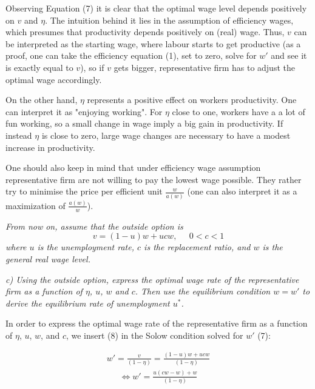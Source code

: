 \documentclass[11pt]{article} %
\begin{document}
\bigskip
Observing Equation (7) it is clear that the optimal wage level depends positively on $v$ and $\eta$. The intuition behind it lies in the assumption of efficiency wages, which presumes that productivity depends positively on (real) wage. Thus, $v$ can be interpreted as the starting wage, where labour starts to get productive (as a proof, one can take the efficiency equation (1), set to zero, solve for $w'$ and see it is exactly equal to $v$), so if $v$ gets bigger, representative firm has to adjust the optimal wage accordingly.\par

On the other hand, $\eta$ represents a positive effect on workers productivity. One can interpret it as "enjoying working". For $\eta$ close to one, workers have a a lot of fun working, so a small change in wage imply a big gain in productivity. If instead $\eta$ is close to zero, large wage changes are necessary to have a modest increase in productivity. \par

One should also keep in mind that under efficiency wage assumption representative firm are not willing to pay the lowest wage possible. They rather try to minimise the price per efficient unit $\frac{w} {a(w)}$ (one can also interpret it as a maximization of $\frac{a(w)} {w}$).




\pagebreak
\textit{From now on, assume that the outside option is}
\begin{equation}
    v = (1-u)w+ucw, \;\;\;\;\; 0<c<1
\end{equation}
\textit{where $u$ is the unemployment rate, $c$ is the replacement ratio, and $w$ is the general real wage level.}



\bigskip
\textit{c) Using the outside option, express the optimal wage rate of the representative firm as a function of $\eta$, $u$, $w$ and $c$. Then use the equilibrium
condition $w=w'$ to derive the equilibrium rate of unemployment $u^*$.} \par

\bigskip
In order to express  the  optimal  wage  rate  of  the  representative  firm  as
a  function  of $\eta$, $u$, $w$, and $c$, we insert (8) in the Solow condition solved for $w'$ (7):

\begin{align*}
    w' = \frac{v} {(1 - \eta)} = \frac{(1-u)w+ucw} {(1 - \eta)}
\end{align*}
\begin{align*}
   \Longleftrightarrow w' = \frac{u\left(cw - w\right) + w} {(1 - \eta)}
\end{align*}
\end{document}
